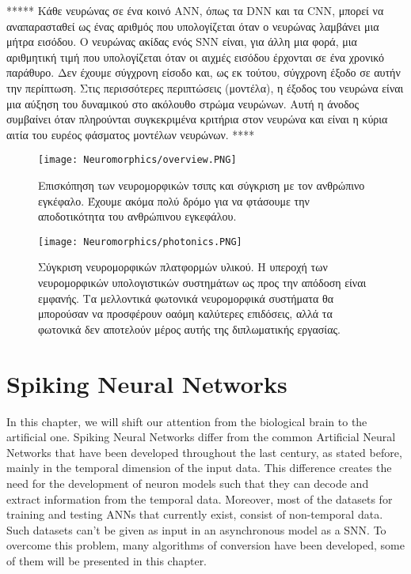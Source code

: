 \documentclass[12pt]{report}
\begin{document}
*****
Κάθε νευρώνας σε ένα κοινό \textlatin{ANN}, όπως τα \textlatin{DNN} και τα \textlatin{CNN}, μπορεί να αναπαρασταθεί ως ένας αριθμός που υπολογίζεται όταν ο νευρώνας λαμβάνει μια μήτρα εισόδου. Ο νευρώνας ακίδας ενός \textlatin{SNN} είναι, για άλλη μια φορά, μια αριθμητική τιμή που υπολογίζεται όταν οι αιχμές εισόδου έρχονται σε ένα χρονικό παράθυρο. Δεν έχουμε σύγχρονη είσοδο και, ως εκ τούτου, σύγχρονη έξοδο σε αυτήν την περίπτωση. Στις περισσότερες περιπτώσεις (μοντέλα), η έξοδος του νευρώνα είναι μια αύξηση του δυναμικού στο ακόλουθο στρώμα νευρώνων. Αυτή η άνοδος συμβαίνει όταν πληρούνται συγκεκριμένα κριτήρια στον νευρώνα και είναι η κύρια αιτία του ευρέος φάσματος μοντέλων νευρώνων.
****
\begin{figure}[htp]
    \centering
    \texttt{[image: Neuromorphics/overview.PNG]}
    \caption{Επισκόπηση των νευρομορφικών τσιπς και σύγκριση με τον ανθρώπινο εγκέφαλο. Έχουμε ακόμα πολύ δρόμο για να φτάσουμε την αποδοτικότητα του ανθρώπινου εγκεφάλου.}
    \label{fig:overview}
\end{figure}

\begin{figure}[htp]
    \centering
    \texttt{[image: Neuromorphics/photonics.PNG]}
    \caption{Σύγκριση νευρομορφικών πλατφορμών υλικού. Η υπεροχή των νευρομορφικών υπολογιστικών συστημάτων ως προς την απόδοση είναι εμφανής. Τα μελλοντικά φωτονικά νευρομορφικά συστήματα θα μπορούσαν να προσφέρουν οαόμη καλύτερες επιδόσεις, αλλά τα φωτονικά δεν αποτελούν μέρος αυτής της διπλωματικής εργασίας.\cite{shastri2018} }
    \label{fig:overview}
\end{figure}
\chapter{Spiking Neural Networks}
In this chapter, we will shift our attention from the biological brain to the artificial one. Spiking Neural Networks differ from the common Artificial Neural Networks that have been developed throughout the last century, as stated before, mainly in the temporal dimension of the input data. This difference creates the need for the development of neuron models such that they can decode and extract information from the temporal data. Moreover, most of the datasets for training and testing ANNs that currently exist, consist of non-temporal data. Such datasets can't be given as input in an asynchronous model as a SNN. To overcome this problem, many algorithms of conversion have been developed, some of them will be presented in this chapter.
\end{document}
